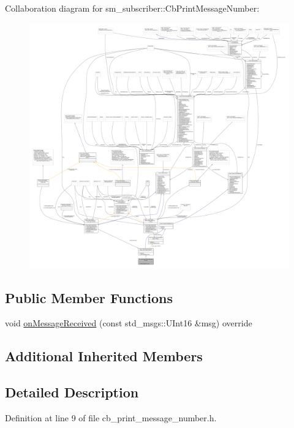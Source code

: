 Collaboration diagram for sm\+\_\+subscriber\+:\+:Cb\+Print\+Message\+Number\+:
\nopagebreak
\begin{figure}[H]
\begin{center}
\leavevmode
\includegraphics[width=350pt]{classsm__subscriber_1_1CbPrintMessageNumber__coll__graph}
\end{center}
\end{figure}
\subsection*{Public Member Functions}
\begin{DoxyCompactItemize}
\item 
void \hyperlink{classsm__subscriber_1_1CbPrintMessageNumber_a8f9a13e3da3fd897354579a31cb9de3f}{on\+Message\+Received} (const std\+\_\+msgs\+::\+U\+Int16 \&msg) override
\end{DoxyCompactItemize}
\subsection*{Additional Inherited Members}


\subsection{Detailed Description}


Definition at line 9 of file cb\+\_\+print\+\_\+message\+\_\+number.\+h.



